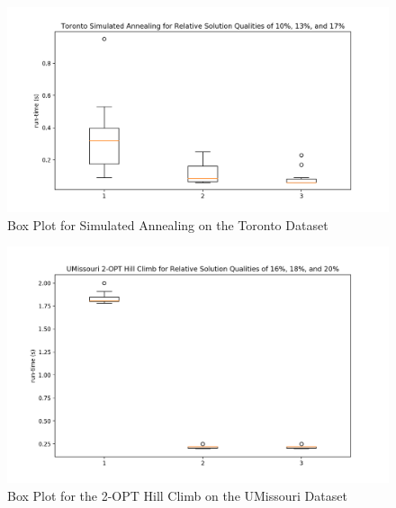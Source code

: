 \documentclass[format=sigconf]{acmart}
\begin{document}
\begin{figure}[htbp]
    \centerline{\includegraphics[scale=.5]{graphs/Toronto_LS2_Box.png}}
    \caption{Box Plot for Simulated Annealing on the Toronto Dataset}
    \label{fig:10}
\end{figure}

\begin{figure}[htbp]
    \centerline{\includegraphics[scale=.5]{graphs/UMissouri_LS1_Box.png}}
    \caption{Box Plot for the 2-OPT Hill Climb on the UMissouri Dataset}
    \label{fig11}
\end{figure}
\end{document}
